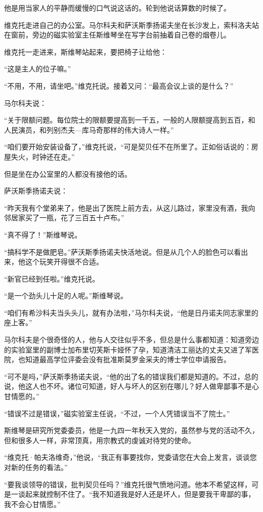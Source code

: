 他是用当家人的平静而缓慢的口气说这话的。轮到他说话算数的时候了。

维克托走进自己的办公室。马尔科夫和萨沃斯季扬诺夫坐在长沙发上，索科洛夫站在窗前，旁边的磁实验室主任斯维琴坐在写字台前抽着自己卷的烟卷儿。

维克托一走进来，斯维琴站起来，要把椅子让给他：

“这是主人的位子嘛。”

“不用，不用，请坐吧。”维克托说。接着又问：“最高会议上谈的是什么？”

马尔科夫说：

“关于限额问题。每位院士的限额要提高到一千五，一般的人限额提高到五百，和人民演员，和列别杰夫—库马奇那样的伟大诗人一样。”

“咱们要开始安装设备了，”维克托说，“可是契贝任不在所里了。正如俗话说的：房屋失火，时钟还在走。”

但是坐在办公室里的人都没有接他的话。

萨沃斯季扬诺夫说：

“昨天我有个堂弟来了，他是出了医院上前方去，从这儿路过，家里没有酒，我向邻居家买了一瓶，花了三百五十卢布。”

“真不得了！”斯维琴说。

“搞科学不是做肥皂。”萨沃斯季扬诺夫快活地说。但是从几个人的脸色可以看出来，他这个玩笑开得很不合适。

“新官已经到任啦。”维克托说。

“是一个劲头儿十足的人呢。”斯维琴说。

“咱们有希沙科夫当头头儿，就有办法啦，”马尔科夫说，“他是日丹诺夫同志家里的座上客。”

马尔科夫是个很奇怪的人，他与人交往似乎不多，但总是什么事都知道：知道旁边的实验室里的副博士加布里切芙斯卡娅怀了孕，知道清洁工丽达的丈夫又进了军医院，也知道最高学位评委会没有批准斯莫罗金采夫的博士学位申请报告。

“可不是吗，”萨沃斯季扬诺夫说，“他的出了名的错误我们都是知道的。不过，总的说，他这人也不坏。诸位可知道，好人与坏人的区别在哪儿？好人做卑鄙事不是心甘情愿的。”

“错误不过是错误，”磁实验室主任说，“不过，一个人凭错误当不了院士。”

斯维琴是研究所党委委员，他是一九四一年秋天入党的，虽然参与党的活动不久，但和很多人一样，非常顶真，用宗教式的虔诚对待党的使命。

“维克托·帕夫洛维奇，”他说，“我正有事要找你，党委请您在大会上发言，谈谈您对新的任务的看法。”

“要我谈领导的错误，批判契贝任吗？”维克托很气愤地问道。他本不希望这样，可是一谈起来就控制不住了。“我不知道我是好人还是坏人，但是要我干卑鄙的事，我不会心甘情愿。”

